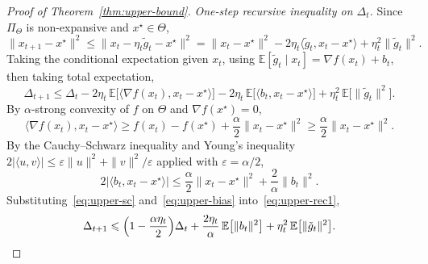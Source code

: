 \documentclass{article}
\renewcommand{\leq}{\leqslant}
\renewcommand{\geq}{\geqslant}
\theoremstyle{definition}
\begin{document}
\begin{proof}[Proof of Theorem~\ref{thm:upper-bound}]
\medskip
\noindent\textit{One-step recursive inequality on $\Delta_t$.}
Since $\Pi_\Theta$ is non-expansive and $x^\star\in\Theta$,
\[
\|x_{t+1}-x^\star\|^2
\leq\|x_t-\eta_t\tilde{g}_t-x^\star\|^2
=\|x_t-x^\star\|^2-2\eta_t\langle\tilde{g}_t,x_t-x^\star\rangle
+\eta_t^2\|\tilde{g}_t\|^2.
\]
Taking the conditional expectation given $x_t$, using 
$\mathbb{E}[\tilde{g}_t\mid x_t]=\nabla f(x_t)+b_t$, then taking 
total expectation,
\begin{equation}
\label{eq:upper-rec1}
\Delta_{t+1}\leq\Delta_t
-2\eta_t\,\mathbb{E}\bigl[\langle\nabla f(x_t),x_t-x^\star\rangle\bigr]
-2\eta_t\,\mathbb{E}\bigl[\langle b_t,x_t-x^\star\rangle\bigr]
+\eta_t^2\,\mathbb{E}\bigl[\|\tilde{g}_t\|^2\bigr].
\end{equation}
By $\alpha$-strong convexity of $f$ on $\Theta$ and 
$\nabla f(x^\star)=0$,
\begin{equation}
\label{eq:upper-sc}
\langle\nabla f(x_t),x_t-x^\star\rangle
\geq f(x_t)-f(x^\star)+\frac{\alpha}{2}\|x_t-x^\star\|^2
\geq\frac{\alpha}{2}\|x_t-x^\star\|^2.
\end{equation}
By the Cauchy--Schwarz inequality and Young's inequality 
$2|\langle u,v\rangle|\leq\varepsilon\|u\|^2+\|v\|^2/\varepsilon$ 
applied with $\varepsilon=\alpha/2$,
\begin{equation}
\label{eq:upper-bias}
2\bigl|\langle b_t,x_t-x^\star\rangle\bigr|
\leq\frac{\alpha}{2}\|x_t-x^\star\|^2+\frac{2}{\alpha}\|b_t\|^2.
\end{equation}
Substituting~\eqref{eq:upper-sc} and~\eqref{eq:upper-bias} 
into~\eqref{eq:upper-rec1},
\begin{equation}
\label{eq:upper-rec2}
\Delta_{t+1}\leq\Bigl(1-\frac{\alpha\eta_t}{2}\Bigr)\Delta_t
+\frac{2\eta_t}{\alpha}\,\mathbb{E}\bigl[\|b_t\|^2\bigr]
+\eta_t^2\,\mathbb{E}\bigl[\|\tilde{g}_t\|^2\bigr].
\end{equation}


\end{proof}
\end{document}
